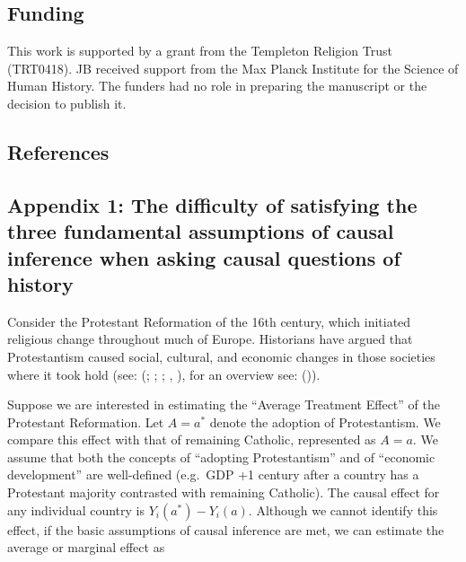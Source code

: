 \documentclass[
  singlecolumn,
  9pt]{article}
\begin{document}
\newpage{}

\subsection{Funding}\label{funding}

This work is supported by a grant from the Templeton Religion Trust
(TRT0418). JB received support from the Max Planck Institute for the
Science of Human History. The funders had no role in preparing the
manuscript or the decision to publish it.

\subsection{References}\label{references}

\newpage{}

\subsection{Appendix 1: The difficulty of satisfying the three
fundamental assumptions of causal inference when asking causal questions
of
history}\label{appendix-1-the-difficulty-of-satisfying-the-three-fundamental-assumptions-of-causal-inference-when-asking-causal-questions-of-history}

Consider the Protestant Reformation of the 16th century, which initiated
religious change throughout much of Europe. Historians have argued that
Protestantism caused social, cultural, and economic changes in those
societies where it took hold (see: (; ;
; , ), for an overview see:
()).

Suppose we are interested in estimating the ``Average Treatment Effect''
of the Protestant Reformation. Let \(A = a^*\) denote the adoption of
Protestantism. We compare this effect with that of remaining Catholic,
represented as \(A = a\). We assume that both the concepts of ``adopting
Protestantism'' and of ``economic development'' are well-defined
(e.g.~GDP +1 century after a country has a Protestant majority
contrasted with remaining Catholic). The causal effect for any
individual country is \(Y_i(a^*) - Y_i(a)\). Although we cannot identify
this effect, if the basic assumptions of causal inference are met, we
can estimate the average or marginal effect as
\end{document}
